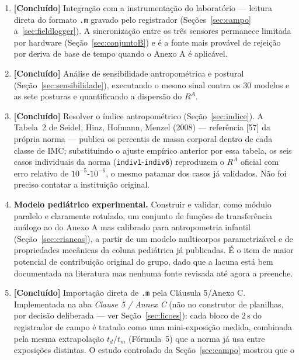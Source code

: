 \documentclass[11pt,a4paper]{article}
\newcommand{\code}[1]{\texttt{\small #1}}
\newcommand{\unit}[2]{\ensuremath{#1\,\mathrm{#2}}}
\begin{document}
\begin{enumerate}
  \item \textbf{[Concluído]} Integração com a instrumentação do laboratório ---
        leitura direta do formato \code{.m} gravado pelo registrador
        (Seções~\ref{sec:campo} a~\ref{sec:fieldlogger}). A sincronização entre
        os três sensores permanece limitada por hardware
        (Seção~\ref{sec:conjuntoB}) e é a fonte mais provável de rejeição por
        deriva de base de tempo quando o Anexo A é aplicável.
  \item \textbf{[Concluído]} Análise de sensibilidade antropométrica e postural
        (Seção~\ref{sec:sensibilidade}), executando o mesmo sinal contra os 30
        modelos e as sete posturas e quantificando a dispersão do $R^A$.
  \item \textbf{[Concluído]} Resolver o índice antropométrico
        (Seção~\ref{sec:indice}). A Tabela~2 de Seidel, Hinz, Hofmann, Menzel
        (2008) --- referência [57] da própria norma --- publica os percentis
        de massa corporal dentro de cada classe de IMC; substituindo o ajuste
        empírico anterior por essa tabela, os seis casos individuais da norma
        (\code{indiv1}-\code{indiv6}) reproduzem o $R^A$ oficial com erro
        relativo de $10^{-5}$-$10^{-6}$, o mesmo patamar dos casos já
        validados. Não foi preciso contatar a instituição original.
  \item \textbf{Modelo pediátrico experimental.} Construir e validar, como
        módulo paralelo e claramente rotulado, um conjunto de funções de
        transferência análogo ao do Anexo A mas calibrado para antropometria
        infantil (Seção~\ref{sec:criancas}), a partir de um modelo
        multicorpos parametrizável e de propriedades mecânicas da coluna
        pediátrica já publicadas. É o item de maior potencial de contribuição
        original do grupo, dado que a lacuna está bem documentada na literatura
        mas nenhuma fonte revisada até agora a preenche.
  \item \textbf{[Concluído]} Importação direta de \code{.m} pela Cláusula
        5/Anexo C. Implementada na aba \emph{Clause 5 / Annex C} (não no
        construtor de planilhas, por decisão deliberada --- ver
        Seção~\ref{sec:licoes}): cada bloco de \unit{2}{s} do registrador de
        campo é tratado como uma mini-exposição medida, combinada pela mesma
        extrapolação $t_d/t_m$ (Fórmula~5) que a norma já usa entre exposições
        distintas. O estudo controlado da Seção~\ref{sec:campo} mostrou que o

\end{enumerate}
\end{document}
